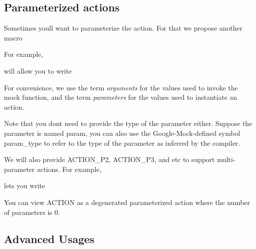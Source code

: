 \subsection*{Parameterized actions}

Sometimes you\textquotesingle{}ll want to parameterize the action. For that we propose another macro 
\begin{DoxyCode}{0}
\end{DoxyCode}


For example, 
\begin{DoxyCode}{0}
\end{DoxyCode}
 will allow you to write 
\begin{DoxyCode}{0}
\end{DoxyCode}


For convenience, we use the term {\itshape arguments} for the values used to invoke the mock function, and the term {\itshape parameters} for the values used to instantiate an action.

Note that you don\textquotesingle{}t need to provide the type of the parameter either. Suppose the parameter is named {\ttfamily param}, you can also use the Google-\/Mock-\/defined symbol {\ttfamily param\+\_\+type} to refer to the type of the parameter as inferred by the compiler.

We will also provide {\ttfamily A\+C\+T\+I\+O\+N\+\_\+\+P2}, {\ttfamily A\+C\+T\+I\+O\+N\+\_\+\+P3}, and etc to support multi-\/parameter actions. For example, 
\begin{DoxyCode}{0}
\DoxyCodeLine{\}}
\end{DoxyCode}
 lets you write 
\begin{DoxyCode}{0}
\end{DoxyCode}


You can view {\ttfamily A\+C\+T\+I\+ON} as a degenerated parameterized action where the number of parameters is 0.

\subsection*{Advanced Usages}


